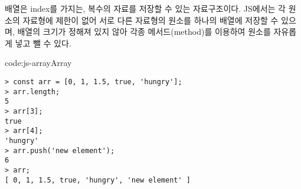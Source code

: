 배열은 index를 가지는, 복수의 자료를 저장할 수 있는 자료구조이다. JS에서는 각 원소의 자료형에 제한이 없어 서로 다른 자료형의 원소를 하나의 배열에 저장할 수 있으며, 배열의 크기가 정해져 있지 않아 각종 메서드(method)를 이용하여 원소를 자유롭게 넣고 뺄 수 있다.

\begin{code}{code:js-array}{Array}
\begin{verbatim}
> const arr = [0, 1, 1.5, true, 'hungry'];
> arr.length;
5
> arr[3];
true
> arr[4];
'hungry'
> arr.push('new element');
6
> arr;
[ 0, 1, 1.5, true, 'hungry', 'new element' ]
\end{verbatim}
\end{code}
